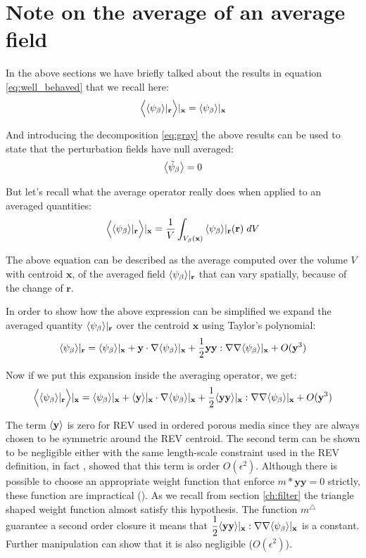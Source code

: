 \section{Note on the average of an average field}
\label{ch:appendix_a}

In the above sections we have briefly talked about the results in equation \eqref{eq:well_behaved} that we recall here:
$$\Big<{\left< \psi_{\beta} \right>}|_{\mathbf{r}} \Big>|_{\mathbf{x}} = {\left< \psi_{\beta} \right>}|_{\mathbf{x}}$$

And introducing the decomposition \eqref{eq:gray} the above results can be used to state that the perturbation fields have null averaged:
$$  {\left< \tilde{\psi}_{\beta} \right>} = 0 $$

But let's recall what the average operator really does when applied to an averaged quantities:
$$  \Big< {\left< \psi_{\beta} \right>}|_{\mathbf{r}} \Big>|_{\mathbf{x}}  = \dfrac{1}{V} \int_{V_\beta(\mathbf{x})} {\left< \psi_{\beta} \right>}|_{\mathbf{r}}(\mathbf{r}) \; dV $$

The above equation can be described as the average computed over the volume $V$ with centroid $\mathbf{x}$, of the averaged field ${\left< \psi_{\beta} \right>}|_{\mathbf{r}}$ that can vary spatially, because of the change of $\mathbf{r}$.

In order to show how the above expression can be simplified we expand the averaged quantity ${\left< \psi_{\beta} \right>}|_{\mathbf{r}}$ over the centroid $\mathbf{x}$ using Taylor's polynomial:
$$
{\left< \psi_{\beta} \right>}|_{\mathbf{r}} = {\left< \psi_{\beta} \right>}|_{\mathbf{x}} + \mathbf{y} \cdot \nabla {\left< \psi_{\beta} \right>}|_{\mathbf{x}} + \dfrac{1}{2} \mathbf{y}\mathbf{y} :  \nabla \nabla {\left< \psi_{\beta} \right>}|_{\mathbf{x}} + O(\mathbf{y}^3)
$$

Now if we put this expansion inside the averaging operator, we get:
$$
\Big< {\left< \psi_{\beta} \right>}|_{\mathbf{r}} \Big>|_{\mathbf{x}} = {\left< \psi_{\beta} \right>}|_{\mathbf{x}} + {\left< \mathbf{y} \right>}|_{\mathbf{x}} \cdot \nabla {\left< \psi_{\beta} \right>}|_{\mathbf{x}} + \dfrac{1}{2} {\left< \mathbf{y}\mathbf{y} \right>}|_{\mathbf{x}} :  \nabla \nabla {\left< \psi_{\beta} \right>}|_{\mathbf{x}} + O(\mathbf{y}^3)
$$

The term ${\left< \mathbf{y} \right>}$ is zero for REV used in ordered porous media since they are always chosen to be symmetric around the REV centroid.
The second term can be shown to be negligible either with the same length-scale constraint used in the REV definition, in fact \citet{ochoa1995momentum}, \citet{paez2017macroscopic} showed that this term is order $O(\epsilon^2)$.
Although there is possible to choose an appropriate weight function that  enforce $m*\mathbf{y}\mathbf{y} =0$ strictly, these function are impractical (\citet{davit2017technical}).
As we recall from section \ref{ch:filter} the triangle shaped weight function almost satisfy this hypothesis. The function $m^{\triangle}$ guarantee a second order closure it means that $\dfrac{1}{2} {\left< \mathbf{y}\mathbf{y} \right>}|_{\mathbf{x}} :  \nabla \nabla {\left< \psi_{\beta} \right>}|_{\mathbf{x}}$ is a constant. Further manipulation can show that it is also negligible ($O(\epsilon^2)$).

